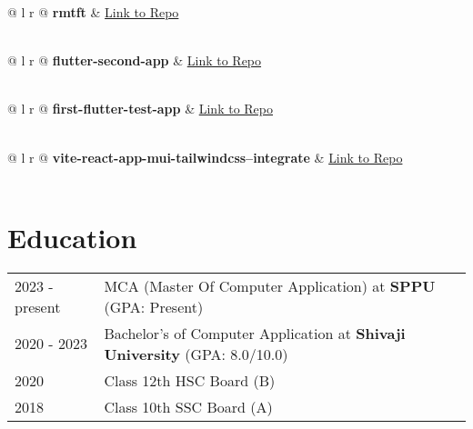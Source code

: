 \documentclass[a4paper,12pt]{article}
\begin{document}
\begin{tabularx}{\linewidth}{@{} l r @{}}
\textbf{rmtft} & \hfill \href{https://github.com/WebNaresh/rmtft}{Link to Repo} \\[3.75pt]
 \\
\end{tabularx}

\begin{tabularx}{\linewidth}{@{} l r @{}}
\textbf{flutter-second-app} & \hfill \href{https://github.com/WebNaresh/flutter-second-app}{Link to Repo} \\[3.75pt]
 \\
\end{tabularx}

\begin{tabularx}{\linewidth}{@{} l r @{}}
\textbf{first-flutter-test-app} & \hfill \href{https://github.com/WebNaresh/first-flutter-test-app}{Link to Repo} \\[3.75pt]
 \\
\end{tabularx}

\begin{tabularx}{\linewidth}{@{} l r @{}}
\textbf{vite-react-app-mui-tailwindcss--integrate} & \hfill \href{https://github.com/WebNaresh/vite-react-app-mui-tailwindcss--integrate}{Link to Repo} \\[3.75pt]
 \\
\end{tabularx}


\section{Education}
\begin{tabularx}{\linewidth}{@{} l X @{}}
2023 - present & MCA (Master Of Computer Application) at \textbf{SPPU} \hfill (GPA: Present) \\

2020 - 2023 & Bachelor's of Computer Application at \textbf{Shivaji University} \hfill (GPA: 8.0/10.0) \\

2020 & Class 12th HSC Board \hfill (B) \\

2018 & Class 10th SSC Board \hfill (A) \\
\end{tabularx}
\end{document}
